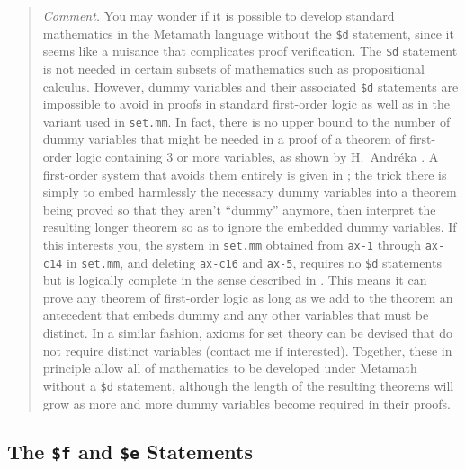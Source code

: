 {\footnotesize\begin{quotation}\label{nodd}
{\em Comment.} You may wonder if it is possible to develop standard
mathematics in the Metamath language without the \texttt{\$d} statement, since it seems like a nuisance that complicates proof
verification. The \texttt{\$d} statement is not needed in certain subsets of
mathematics such as propositional calculus.  However, dummy
variables and their associated \texttt{\$d}
statements are impossible to avoid in proofs in standard first-order logic as
well as in the variant used in \texttt{set.mm}.  In fact, there is no upper bound to
the number of dummy variables that might be needed in a proof of a theorem of
first-order logic containing 3 or more variables, as shown by H.\
Andr\'{e}ka \cite{Nemeti}.  A first-order system that
avoids them entirely is given in \cite{Megill}\index{Megill, Norman}; the
trick there is simply to embed harmlessly the necessary dummy variables into a
theorem being proved so that they aren't ``dummy'' anymore, then interpret the
resulting longer theorem so as to ignore the embedded dummy variables.  If
this interests you, the system in \texttt{set.mm} obtained from \texttt{ax-1}
through \texttt{ax-c14} in \texttt{set.mm}, and deleting \texttt{ax-c16} and \texttt{ax-5},
requires no \texttt{\$d} statements but is logically complete in the sense
described in \cite{Megill}.  This means it can prove any theorem of
first-order logic as long as we add to the theorem an antecedent that embeds
dummy and any other variables that must be distinct.  In a similar fashion,
axioms for set theory can be devised that do not require distinct variables
(contact me if interested).  Together, these in principle allow all of
mathematics to be developed under Metamath without a \texttt{\$d} statement,
although the length of the resulting theorems will grow as more and
more dummy variables become required in their proofs.
\end{quotation}}

\subsection{The \texttt{\$f}
and \texttt{\$e} Statements}\label{dollaref}

